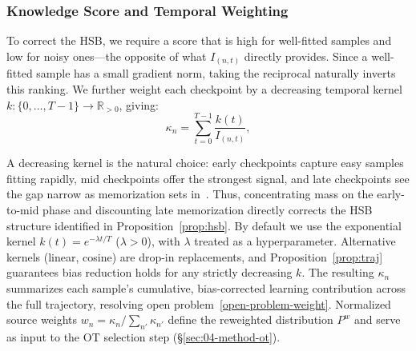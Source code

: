 \subsubsection{Knowledge Score and Temporal Weighting} \label{sec:04-gradient-kappa}
\begin{foldable} %
  To correct the HSB, we require a score that is high for well-fitted samples and low for noisy ones---the opposite of what $I_{(n,t)}$ directly provides.
  Since a well-fitted sample has a small gradient norm, taking the reciprocal naturally inverts this ranking.
  We further weight each checkpoint by a decreasing temporal kernel $k : \{0,\ldots,T-1\} \to \mathbb{R}_{>0}$, giving:
  \begin{equation}
    \kappa_n = \sum_{t=0}^{T-1} \frac{k(t)}{I_{(n,t)}},
    \label{eq:kappa}
  \end{equation}
\end{foldable}

\begin{foldable}
  A decreasing kernel is the natural choice: early checkpoints capture easy samples fitting rapidly, mid checkpoints offer the strongest signal, and late checkpoints see the gap narrow as memorization sets in~\cite{arpit2017closer}.
  Thus, concentrating mass on the early-to-mid phase and discounting late memorization directly corrects the HSB structure identified in Proposition~\ref{prop:hsb}.
  By default we use the exponential kernel $k(t) = e^{-\lambda t / T}$ ($\lambda > 0$), with $\lambda$ treated as a hyperparameter.
  Alternative kernels (linear, cosine) are drop-in replacements, and Proposition~\ref{prop:traj} guarantees bias reduction holds for any strictly decreasing $k$.
  The resulting $\kappa_n$ summarizes each sample's cumulative, bias-corrected learning contribution across the full trajectory, resolving open problem~\ref{open-problem-weight}.
  Normalized source weights $w_n = \kappa_n / \sum_{n'} \kappa_{n'}$ define the reweighted distribution $P^w$ and serve as input to the OT selection step (\S\ref{sec:04-method-ot}).
\end{foldable}

